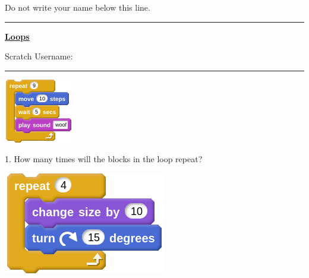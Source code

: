 \documentclass[letterpaper,12pt]{article}
\newcommand\numbox{%
    \fbox{\rule{1in}{0pt}\rule[-1ex]{0pt}{5ex}}}
\begin{document}
\noindent Do not write your name below this line. \\
\noindent \hrule
\begin{center}
{\Large \textbf{\underline{Loops}}} \\
\end{center}
Scratch Username: \rule{4cm}{0.4pt}

\noindent \dotfill


\begin{center}
\includegraphics[scale=1]{q1_script0.png}
\end{center}
1. How many times will the blocks in the loop repeat?
\numbox \\

\noindent \dotfill
\begin{center}
\includegraphics[scale=.4]{q2_script0.png}
\end{center}
\end{document}
